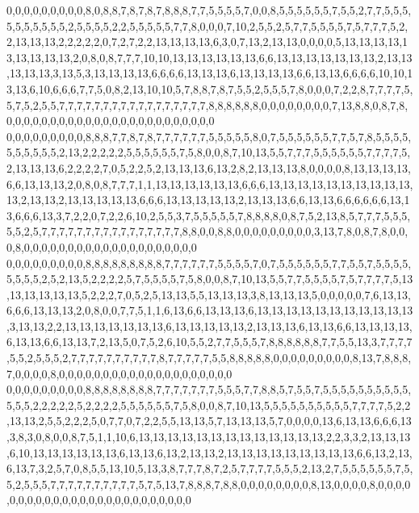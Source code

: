 0,0,0,0,0,0,0,0,0,8,0,8,8,7,8,7,8,7,8,8,8,7,7,5,5,5,5,7,0,0,8,5,5,5,5,5,5,7,5,5,2,7,7,5,5,5,5,5,5,5,5,5,5,2,5,5,5,5,2,2,5,5,5,5,5,7,7,8,0,0,0,7,10,2,5,5,2,5,7,7,5,5,5,5,7,5,7,7,7,5,2,2,13,13,13,2,2,2,2,2,0,7,2,7,2,2,13,13,13,13,6,3,0,7,13,2,13,13,0,0,0,0,5,13,13,13,13,13,13,13,13,13,2,0,8,0,8,7,7,7,10,10,13,13,13,13,13,13,6,6,13,13,13,13,13,13,13,2,13,13,13,13,13,3,13,5,3,13,13,13,13,6,6,6,6,13,13,13,6,13,13,13,13,6,6,13,13,6,6,6,6,10,10,13,13,6,10,6,6,6,7,7,5,0,8,2,13,10,10,5,7,8,8,7,8,7,5,5,2,5,5,5,7,8,0,0,0,7,2,2,8,7,7,7,7,5,5,7,5,2,5,5,7,7,7,7,7,7,7,7,7,7,7,7,7,7,7,7,7,8,8,8,8,8,8,0,0,0,0,0,0,0,0,7,13,8,8,0,8,7,8,0,0,0,0,0,0,0,0,0,0,0,0,0,0,0,0,0,0,0,0,0,0,0,0
0,0,0,0,0,0,0,0,0,8,8,8,7,7,8,7,8,7,7,7,7,7,7,5,5,5,5,5,8,0,7,5,5,5,5,5,5,7,7,5,7,8,5,5,5,5,5,5,5,5,5,5,2,13,2,2,2,2,2,5,5,5,5,5,5,7,5,8,0,0,8,7,10,13,5,5,7,7,7,5,5,5,5,5,5,7,7,7,7,5,2,13,13,13,6,2,2,2,2,7,0,5,2,2,5,2,13,13,13,6,13,2,8,2,13,13,13,8,0,0,0,0,8,13,13,13,13,6,6,13,13,13,2,0,8,0,8,7,7,7,1,1,13,13,13,13,13,13,6,6,6,13,13,13,13,13,13,13,13,13,13,13,2,13,13,2,13,13,13,13,13,6,6,6,13,13,13,13,13,2,13,13,13,6,6,13,13,6,6,6,6,6,6,13,13,6,6,6,13,3,7,2,2,0,7,2,2,6,10,2,5,5,3,7,5,5,5,5,5,7,8,8,8,8,0,8,7,5,2,13,8,5,7,7,7,5,5,5,5,5,2,5,7,7,7,7,7,7,7,7,7,7,7,7,7,7,7,7,8,8,0,0,8,8,0,0,0,0,0,0,0,0,0,3,13,7,8,0,8,7,8,0,0,0,8,0,0,0,0,0,0,0,0,0,0,0,0,0,0,0,0,0,0,0,0
0,0,0,0,0,0,0,0,0,8,8,8,8,8,8,8,8,8,7,7,7,7,7,7,5,5,5,5,7,0,7,5,5,5,5,5,5,7,7,5,5,7,5,5,5,5,5,5,5,5,2,5,2,13,5,2,2,2,2,5,7,5,5,5,5,7,5,8,0,0,8,7,10,13,5,5,7,7,5,5,5,5,7,5,7,7,7,7,5,13,13,13,13,13,13,5,2,2,2,7,0,5,2,5,13,13,5,5,13,13,13,3,8,13,13,13,5,0,0,0,0,0,7,6,13,13,6,6,6,13,13,13,2,0,8,0,0,7,7,5,1,1,6,13,6,6,13,13,13,6,13,13,13,13,13,13,13,13,13,13,13,3,13,13,2,2,13,13,13,13,13,13,13,6,13,13,13,13,13,2,13,13,13,6,13,13,6,6,13,13,13,13,6,13,13,6,6,13,13,7,2,13,5,0,7,5,2,6,10,5,5,2,7,7,5,5,5,7,8,8,8,8,8,8,7,7,5,5,13,3,7,7,7,7,5,5,2,5,5,5,2,7,7,7,7,7,7,7,7,7,7,8,7,7,7,7,7,5,5,8,8,8,8,8,0,0,0,0,0,0,0,0,0,8,13,7,8,8,8,7,0,0,0,0,8,0,0,0,0,0,0,0,0,0,0,0,0,0,0,0,0,0,0,0,0
0,0,0,0,0,0,0,0,0,8,8,8,8,8,8,8,8,7,7,7,7,7,7,7,5,5,5,7,7,8,8,5,7,5,5,7,5,5,5,5,5,5,5,5,5,5,5,5,5,2,2,2,2,2,5,2,2,2,2,5,5,5,5,5,5,7,5,8,0,0,8,7,10,13,5,5,5,5,5,5,5,5,5,5,7,7,7,7,5,2,2,13,13,2,5,5,2,2,2,5,0,7,7,0,7,2,2,5,5,13,13,5,7,13,13,13,5,7,0,0,0,0,13,6,13,13,6,6,6,13,3,8,3,0,8,0,0,8,7,5,1,1,10,6,13,13,13,13,13,13,13,13,13,13,13,13,13,2,2,3,3,2,13,13,13,6,10,13,13,13,13,13,13,6,13,13,6,13,2,13,13,2,13,13,13,13,13,13,13,13,13,6,6,13,2,13,6,13,7,3,2,5,7,0,8,5,5,13,10,5,13,3,8,7,7,7,8,7,2,5,7,7,7,7,5,5,5,2,13,2,7,5,5,5,5,5,5,7,5,5,2,5,5,5,7,7,7,7,7,7,7,7,7,7,5,7,5,13,7,8,8,8,7,8,8,0,0,0,0,0,0,0,0,8,13,0,0,0,0,8,0,0,0,0,0,0,0,0,0,0,0,0,0,0,0,0,0,0,0,0,0,0,0,0,0
